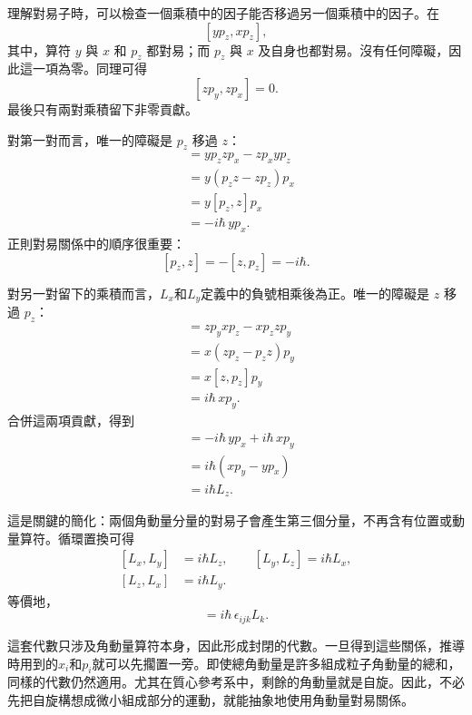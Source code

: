 \begin{classroomqa}
\end{classroomqa}

理解對易子時，可以檢查一個乘積中的因子能否移過另一個乘積中的因子。在
\[
[yp_z,xp_z],
\]
其中，算符 \(y\) 與 \(x\) 和 \(p_z\) 都對易；而 \(p_z\) 與 \(x\) 及自身也都對易。沒有任何障礙，因此這一項為零。同理可得
\[
[zp_y,zp_x]=0.
\]
最後只有兩對乘積留下非零貢獻。

對第一對而言，唯一的障礙是 \(p_z\) 移過 \(z\)：
\begin{align}
[yp_z,zp_x]
&=yp_zzp_x-zp_xyp_z \\
&=y(p_zz-zp_z)p_x \\
&=y[p_z,z]p_x \\
&=-i\hbar\,yp_x.
\end{align}
正則對易關係中的順序很重要：
\[
[p_z,z]=-[z,p_z]=-i\hbar.
\]

對另一對留下的乘積而言，\(L_x\)和\(L_y\)定義中的負號相乘後為正。唯一的障礙是 \(z\) 移過 \(p_z\)：
\begin{align}
[zp_y,xp_z]
&=zp_yxp_z-xp_zzp_y \\
&=x(zp_z-p_zz)p_y \\
&=x[z,p_z]p_y \\
&=i\hbar\,xp_y.
\end{align}
合併這兩項貢獻，得到
\begin{align}
[L_x,L_y]
&=-i\hbar\,yp_x+i\hbar\,xp_y \\
&=i\hbar(xp_y-yp_x) \\
&=i\hbar L_z.
\end{align}

這是關鍵的簡化：兩個角動量分量的對易子會產生第三個分量，不再含有位置或動量算符。循環置換可得
\begin{equation}
\begin{aligned}
[L_x,L_y]&=i\hbar L_z,\qquad
[L_y,L_z]=i\hbar L_x,\\
[L_z,L_x]&=i\hbar L_y.
\end{aligned}
\end{equation}
等價地，
\begin{equation}
[L_i,L_j]=i\hbar\,\epsilon_{ijk}L_k.
\end{equation}

這套代數只涉及角動量算符本身，因此形成封閉的代數。一旦得到這些關係，推導時用到的\(x_i\)和\(p_i\)就可以先擱置一旁。即使總角動量是許多組成粒子角動量的總和，同樣的代數仍然適用。尤其在質心參考系中，剩餘的角動量就是自旋。因此，不必先把自旋構想成微小組成部分的運動，就能抽象地使用角動量對易關係。

